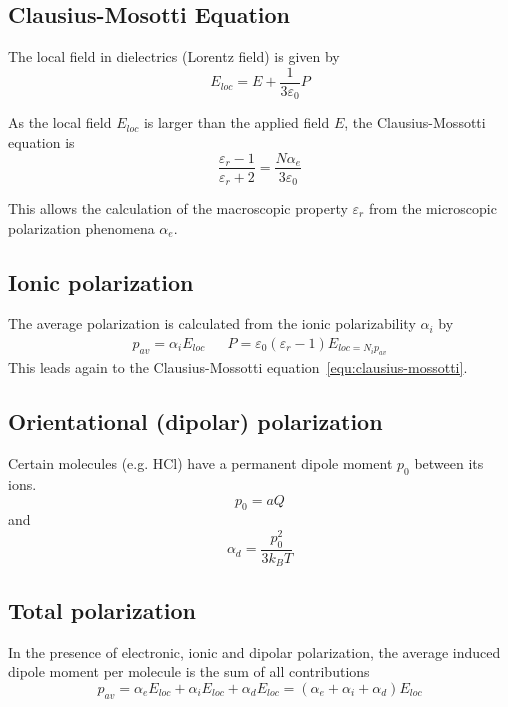 \subsection{Clausius-Mosotti Equation}
The local field in dielectrics (Lorentz field) is given by
\begin{equation}
	E_{loc} = E + \frac{1}{3 \varepsilon_0} P
\end{equation}

As the local field $E_{loc}$ is larger than the applied field $E$, the Clausius-Mossotti equation is
\begin{equation} \label{equ:clausius-mossotti}
	\frac{\varepsilon_r - 1}{\varepsilon_r+2} = \frac{N \alpha_e}{3 \varepsilon_0}
\end{equation}

This allows the calculation of the macroscopic property $\varepsilon_r$ from the
microscopic polarization phenomena $\alpha_e$.

\subsection{Ionic polarization}
The average polarization is calculated from the ionic polarizability $\alpha_i$ by
\begin{align}
    p_{av} = \alpha_i E_{loc} && P = \varepsilon_0 (\varepsilon_r - 1) E_{loc = N_i p_{av}}
\end{align}
This leads again to the Clausius-Mossotti equation~\eqref{equ:clausius-mossotti}. 

\subsection{Orientational (dipolar) polarization}
Certain molecules (e.g. HCl) have a permanent dipole moment $p_0$ between its ions.
\begin{equation}
    p_0 = a Q
\end{equation}
and
\begin{equation}
    \alpha_d = \frac{p_0^2}{3 k_B T}
\end{equation} 

\subsection{Total polarization}
In the presence of electronic, ionic and dipolar polarization, the average induced
dipole moment per molecule is the sum of all contributions
\begin{equation}
    p_{av} = \alpha_e E_{loc} + \alpha_i E_{loc} + \alpha_d E_{loc} = (\alpha_e + \alpha_i + \alpha_d) E_{loc}
\end{equation}

